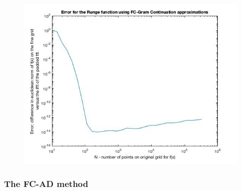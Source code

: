 \documentclass[11pt]{amsart}
\begin{document}
\begin{figure}[h]
\begin{center}
\includegraphics[scale=0.5]{ErrorRunge.jpg}
\end{center}
\end{figure}


\subsubsection{The FC-AD method}
\end{document}
